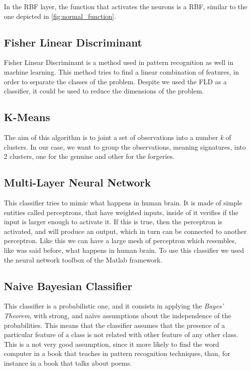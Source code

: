 \documentclass[12pt,a4paper]{report}
\begin{document}
			
			In the RBF layer, the function that activates the neurons is a RBF, similar to the one depicted in \ref{fig:normal_function}.
			
			\subsection{Fisher Linear Discriminant}
			Fisher Linear Discriminant is a method used in pattern recognition as well in machine learning. This method tries to find a linear combination of features, in order to separate the classes of the problem. Despite we used the FLD as a classifier, it could be used to reduce the dimensions of the problem.
			
			\subsection{K-Means}
			The aim of this algorithm is to joint a set of observations into a number \emph{k} of clusters. In our case, we want to group the observations, meaning signatures, into 2 clusters, one for the genuine and other for the forgeries.
			
			
			\subsection{Multi-Layer Neural Network}
			\label{sec:ml_neural_network}
			This classifier tries to mimic what happens in human brain. It is made of simple entities called perceptrons, that have weighted inputs, inside of it verifies if the input is larger enough to activate it. If this is true, then the perceptron is activated, and will produce an output, which in turn can be connected to another perceptron. Like this we can have a large mesh of perceptron which resembles, like was said before, what happens in human brain.
			To use this classifier we used the neural network toolbox of the Matlab framework.
			\subsection{Naive Bayesian Classifier}
			
			This classifier is a probabilistic one, and it consists in applying the \emph{Bayes' Theorem}, with strong, and naive assumptions about the independence of the probabilities. This means that the classifier assumes that the presence of a particular feature of a class is not related with other feature of any other class. This is a not very good assumption, since it more likely to find the word computer in a book that teaches in pattern recognition techniques, than, for instance in a book that talks about poems.
			
\end{document}
